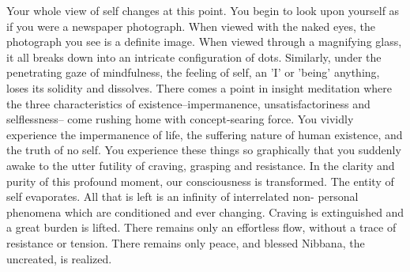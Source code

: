 Your whole view of self changes at this point. You begin to look upon yourself
as if you were a newspaper photograph. When viewed with the naked eyes, the
photograph you see is a definite image. When viewed through a magnifying glass,
it all breaks down into an intricate configuration of dots. Similarly, under the
penetrating gaze of mindfulness, the feeling of self, an 'I' or 'being'
anything, loses its solidity and dissolves. There comes a point in insight
meditation where the three characteristics of existence--impermanence,
unsatisfactoriness and selflessness-- come rushing home with concept-searing
force. You vividly experience the impermanence of life, the suffering nature of
human existence, and the truth of no self. You experience these things so
graphically that you suddenly awake to the utter futility of craving, grasping
and resistance. In the clarity and purity of this profound moment, our
consciousness is transformed. The entity of self evaporates. All that is left is
an infinity of interrelated non- personal phenomena which are conditioned and
ever changing. Craving is extinguished and a great burden is lifted. There
remains only an effortless flow, without a trace of resistance or tension. There
remains only peace, and blessed Nibbana, the uncreated, is realized.